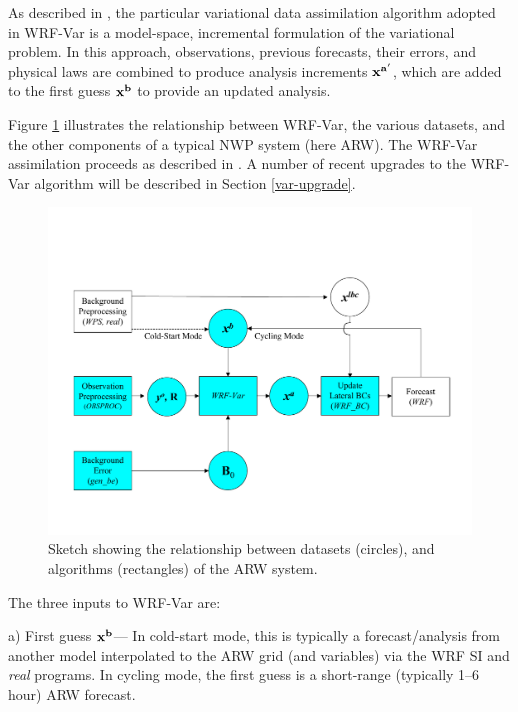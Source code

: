 As described in \citet{barker04}, the particular variational data
assimilation algorithm adopted in WRF-Var is a model-space, incremental
formulation of the variational problem.  In this approach, observations,
previous forecasts, their errors, and physical laws are combined to
produce analysis increments ${\bf x^{a'}}$, which are added to the first
guess ${\bf x^{b}}$ to provide an updated analysis.

Figure \ref{var-sketch} illustrates the relationship between WRF-Var,
the various datasets, and the other components of a typical NWP system
(here ARW). The WRF-Var assimilation proceeds as described in
\citet{barker04}. A number of recent upgrades to the WRF-Var algorithm
will be described in Section \ref{var-upgrade}.

%
%
\begin{figure}
  \centering
  \includegraphics[width=6.5in]{figures/var-sketch.pdf}
  \caption{\label{var-sketch}Sketch showing the relationship between datasets (circles), 
           and algorithms (rectangles) of the ARW system.}
\end{figure}

The three inputs to WRF-Var are: 

\vspace{0.5cm}

a) First guess ${\bf x^{b}}$--- In cold-start mode, this is typically a
forecast/analysis from another model interpolated to the ARW grid (and variables) via the 
WRF SI and {\it real} programs. In cycling mode, the first guess 
is a short-range (typically 1--6 hour) ARW forecast. 


